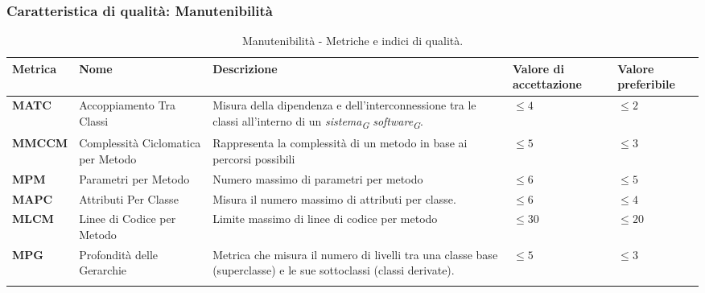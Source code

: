 \subsubsection{Caratteristica di qualità: Manutenibilità}
\hspace{1pt}
    \begin{longtable}{|C{1.8cm}|L{3cm}|L{4cm}|L{2.5cm}|L{2.5cm}|}
                \hline
                \textbf{Metrica} & \textbf{Nome} & \textbf{Descrizione} & \textbf{Valore di accettazione} & \textbf{Valore preferibile}\\
                \hline
                \textbf{MATC} & Accoppiamento Tra Classi & Misura della dipendenza e dell'interconnessione tra le classi all'interno di un \textit{sistema}\textsubscript{\textit{G}} \textit{software}\textsubscript{\textit{G}}.   & $\leq 4$  & $\leq 2$ \\
                \hline
                \textbf{MMCCM} & Complessità Ciclomatica per Metodo & Rappresenta la complessità di un metodo in base ai percorsi possibili & $\leq 5$ & $\leq 3$ \\
                \hline
                \textbf{MPM} & Parametri per Metodo & Numero massimo di parametri per metodo & $\leq 6$ & $\leq 5$ \\
                \hline
                \textbf{MAPC} & Attributi Per Classe & Misura il numero massimo di attributi per classe. & $\leq 6$ & $\leq 4$ \\
                \hline
                 \textbf{MLCM} & Linee di Codice per Metodo & Limite massimo di linee di codice per metodo & $\leq 30$ & $\leq 20$ \\
                \hline
                \textbf{MPG} & Profondità delle Gerarchie & Metrica che misura il numero di livelli tra una classe base (superclasse) e le sue sottoclassi (classi derivate). & $\leq 5$  & $\leq 3$ \\
                \hline
                \caption{Manutenibilità - Metriche e indici di qualità.}
        \label{tab:metriche_manutenibilità_testo}
    \end{longtable}


